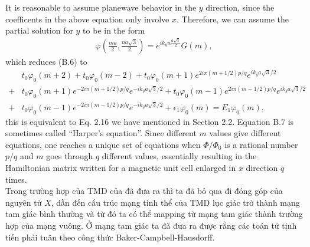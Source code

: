 \documentclass{report}
\newcommand{\f}[2]{\dfrac{#1}{#2}}
\begin{document}
It is reasonable to assume planewave behavior in the $y$ direction, since the coefficents in the above equation only involve $x$. Therefore, we can assume the partial solution for $y$ to be in the form
\begin{gather}
	\varphi(\frac{ma}{2},\frac{na\sqrt{3}}{2}) = e^{i k_{y} n \frac{a\sqrt{3}}{2}} G(m),
\end{gather}
which reduces (B.6) to
\begin{equation}
	\begin{aligned}
		  & t_{0} \varphi_{0}(m + 2) + t_{0} \varphi_{0}(m - 2) + t_{0} \varphi_{0}(m + 1) e^{2 i \pi (m + 1 /2) p/ q} e^{i k_{y} a\sqrt{3} / 2}                              \\
		+ & t_{0} \varphi_{0}(m + 1) e^{-2 i \pi (m + 1 /2) p/ q} e^{-i k_{y} a\sqrt{3} / 2} + t_{0} \varphi_{0}(m - 1) e^{2 i \pi (m - 1 /2) p/ q} e^{i k_{y} a\sqrt{3} / 2} \\
		+ & t_{0} \varphi_{0}(m - 1) e^{-2 i \pi (m - 1 /2) p/ q} e^{-i k_{y} a\sqrt{3} / 2} + \epsilon_{1} \varphi_{0}(m) = E_{1} \varphi_{0}(m),
	\end{aligned}
\end{equation}
this is equivalent to Eq. 2.16 we have mentioned in Section 2.2. Equation B.7 is sometimes called ``Harper's equation''. \cite{harper1955general} Since different $m$ values give different equations, one reaches a unique set of equations when $\Phi / \Phi_{0}$ is a rational number $p / q$ and $m$ goes through $q$ different values, essentially resulting in the Hamiltonian matrix written for a magnetic unit cell enlarged in $x$ direction $q$ times. \\
Trong trường hợp của TMD của \cite{PhysRevB.88.085433} đã đưa ra thì ta đã bỏ qua đi đóng góp của nguyên tử $X$, dẫn đến cấu trúc mạng tinh thể của TMD lục giác trở thành mạng tam giác bình thường và từ đó ta có thể mapping từ mạng tam giác thành trường hợp của mạng vuông. Ở mạng tam giác ta đã đưa ra được rằng các toán tử tịnh tiến phải tuân theo công thức Baker-Campbell-Hausdorff.
\end{document}
